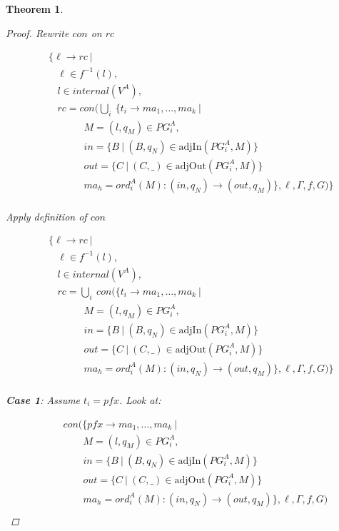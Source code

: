 \documentclass[twocolumn, openany]{sig-alternate-10pt}
\newtheorem{thm}{Theorem}
\begin{document}
\begin{thm}
\begin{proof}
  Rewrite $con$ on $rc$

  \[ \begin{array}{l}
     ~~~~~ \{ \ell \rightarrow rc ~\vert~ \\
     ~~~~~~~~~ \ell \in f^{-1}(l), \\
     ~~~~~~~~~ l \in internal(V^A), \\
     ~~~~~~~~~ rc = con(\bigcup_i~ \{ t_i \rightarrow ma_1, \dots, ma_k ~\vert~ \\
     ~~~~~~~~~~~~~~~~~~~~~ M = (l,q_M) \in PG^A_i, \\
     ~~~~~~~~~~~~~~~~~~~~~ in = \{ B ~\vert~ (B,q_N) \in \text{adjIn}(PG^A_i,M) \} \\
     ~~~~~~~~~~~~~~~~~~~~~ out = \{ C ~\vert~ (C,\_) \in \text{adjOut}(PG^A_i,M) \} \\
     ~~~~~~~~~~~~~~~~~~~~~ ma_h = ord^A_i(M) : (in,q_N) \rightarrow (out,q_M) \}, \ell,\Gamma,f,G) \} \\
  \end{array} \]%

  Apply definition of $con$

  \[ \begin{array}{l}
     ~~~~~ \{ \ell \rightarrow rc ~\vert~ \\
     ~~~~~~~~~ \ell \in f^{-1}(l), \\
     ~~~~~~~~~ l \in internal(V^A), \\
     ~~~~~~~~~ rc = \bigcup_i~ con(\{ t_i \rightarrow ma_1, \dots, ma_k ~\vert~ \\
     ~~~~~~~~~~~~~~~~~~~~~ M = (l,q_M) \in PG^A_i, \\
     ~~~~~~~~~~~~~~~~~~~~~ in = \{ B ~\vert~ (B,q_N) \in \text{adjIn}(PG^A_i,M) \} \\
     ~~~~~~~~~~~~~~~~~~~~~ out = \{ C ~\vert~ (C,\_) \in \text{adjOut}(PG^A_i,M) \} \\
     ~~~~~~~~~~~~~~~~~~~~~ ma_h = ord^A_i(M) : (in,q_N) \rightarrow (out,q_M) \}, \ell,\Gamma,f,G) \} \\
  \end{array} \]%

  \vspace{1em}
  \textbf{Case 1}: Assume $t_i = pfx$. Look at:

  \[ \begin{array}{l}
     ~~~~~~~~~ con(\{ pfx \rightarrow ma_1, \dots, ma_k ~\vert~ \\
     ~~~~~~~~~~~~~~~~~~ M = (l,q_M) \in PG^A_i, \\
     ~~~~~~~~~~~~~~~~~~ in = \{ B ~\vert~ (B,q_N) \in \text{adjIn}(PG^A_i,M) \} \\
     ~~~~~~~~~~~~~~~~~~ out = \{ C ~\vert~ (C,\_) \in \text{adjOut}(PG^A_i,M) \} \\
     ~~~~~~~~~~~~~~~~~~ ma_h = ord^A_i(M) : (in,q_N) \rightarrow (out,q_M) \},\ell,\Gamma,f,G) \\
  \end{array} \]%


\end{proof}
\end{thm}
\end{document}
